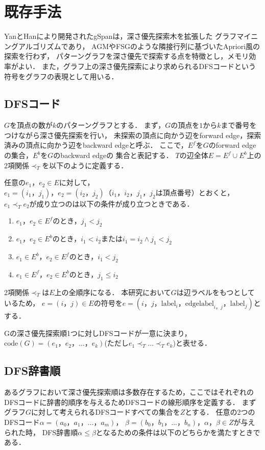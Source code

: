 \documentclass[12pt,fleqn]{jsotsuron}
\begin{document}
\section{既存手法}
YanとHanにより開発されたgSpan\cite{gSpan}は，深さ優先探索木を拡張した
グラフマイニングアルゴリズムであり，
AGM\cite{agm1,agm2}やFSG\cite{fsg}のような隣接行列に基づいたApriori風の探索を行わず，
パターングラフを深さ優先で探索する点を特徴とし，メモリ効率がよい．
また，グラフ上の深さ優先探索により求められるDFSコードという符号をグラフの表現として用いる．
\subsection{DFSコード}
$G$を頂点の数が$k$のパターングラフとする．
まず，$G$の頂点を$1$から$k$まで番号をつけながら深さ優先探索を行い，
未探索の頂点に向かう辺をforward edge，探索済みの頂点に向かう辺をbackward edgeと呼ぶ．
ここで，$E^f$を$G$のforward edgeの集合，$E^b$を$G$のbackward edgeの
集合と表記する．
$T$の辺全体$E=E^f\cup E^b$上の
2項関係$\prec_T$を以下のように定義する．

任意の$e_1，e_2\in E$に対して，$e_1=(i_1，j_1)，e_2=(i_2，j_2)（i_1，i_2，j_1，j_2は頂点番号）$とおくと，
$e_1\prec_T e_2$が成り立つのは以下の条件が成り立つときである．
\begin{enumerate}
\renewcommand{\labelenumi}{(\roman{enumi})}
  \item $e_1，e_2\in E^f$のとき，$j_1 < j_2$
  \item $e_1，e_2\in E^b$のとき，$i_1 < i_2またはi_1=i_2\wedge j_1 < j_2 $
  \item $e_1\in E^b，e_2\in E^f$のとき，$i_1 < j_2$
  \item $e_1\in E^f，e_2\in E^b$のとき，$j_1\leq i_2$
\end{enumerate}
2項関係$\prec_T$は$E$上の全順序になる．
本研究において$G$は辺ラベルをもつとしているため，
$e=(i，j)\in E$の符号を$e=(i，j，\mathrm{label}_i，\mathrm{edgelabel}_{i，j}，\mathrm{label}_j)$とする．

Gの深さ優先探索順1つに対しDFSコードが一意に決まり，
$\mathrm{code}(G)=(e_1，e_2，\dots ，e_k)$(ただし$e_1\prec_T \dots \prec_T e_k$)と表せる．

\subsection{DFS辞書順}
あるグラフにおいて深さ優先探索順は多数存在するため，ここではそれぞれのDFSコードに辞書的順序を与えるためDFSコードの線形順序を定義する．
まずグラフ$G$に対して考えられるDFSコードすべての集合を$Z$とする．
任意の2つのDFSコード$\alpha = (a_0，a_1，\dots ，a_m)$，
$\beta = (b_0，b_1，\dots ，b_n)$，$\alpha ，\beta \in Z$が与えられた時，
DFS辞書順$\alpha \leq \beta$となるための条件は以下のどちらかを満たすときである．
\end{document}
